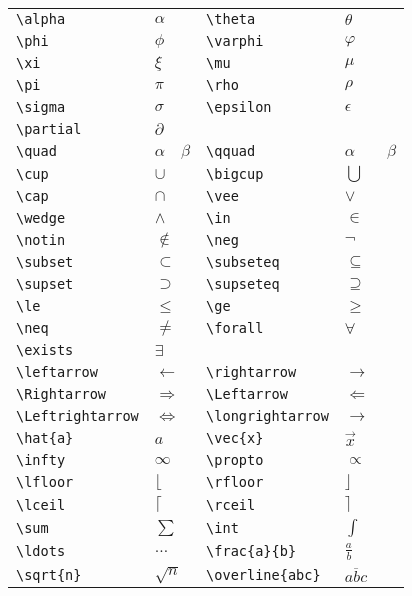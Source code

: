 \begin{tabular}{@{}ll|ll@{}}
  \verb$\alpha$ & $\alpha$ & \verb$\theta$ & $\theta$ \\
  \verb$\phi$ & $\phi$ & \verb$\varphi$ & $\varphi$ \\
  \verb$\xi$ & $\xi$ & \verb$\mu$& $\mu$\\
  \verb$\pi$ & $\pi$ & \verb$\rho$ & $\rho$\\
  \verb$\sigma$ & $\sigma$ & \verb$\epsilon$ & $\epsilon$\\
  \verb$\partial$ & $\partial$\\
  \hline
  \verb$\quad$ & $\alpha\quad\beta$ & \verb$\qquad$ & $\alpha\qquad\beta$\\
  \hline
  \verb$\cup$ & $\cup$ & \verb$\bigcup$ & $\bigcup$ \\
  \verb$\cap$ & $\cap$ & \verb$\vee$ & $\vee$ \\
  \verb$\wedge$ & $\wedge$ & \verb$\in$ & $\in$ \\
  \verb$\notin$ & $\notin$ & \verb$\neg$ & $\neg$ \\
  \verb$\subset$ & $\subset$ & \verb$\subseteq$ & $\subseteq$\\
  \verb$\supset$ & $\supset$ & \verb$\supseteq$ & $\supseteq$ \\
  \verb$\le$ & $\le$ & \verb$\ge$ & $\ge$\\
  \verb$\neq$ & $\neq$ & \verb$\forall$ & $\forall$\\
  \verb$\exists$ & $\exists$\\
  \hline
  \verb$\leftarrow$ & $\leftarrow$ & \verb$\rightarrow$ & $\rightarrow$\\
  \verb$\Rightarrow$ & $\Rightarrow$ & \verb$\Leftarrow$ & $\Leftarrow$\\
  \verb$\Leftrightarrow$ & $\Leftrightarrow$ & \verb$\longrightarrow$ & $\longrightarrow$\\
  \hline
  \verb$\hat{a}$ & $\hat{a}$ & \verb$\vec{x}$ & $\vec{x}$\\
  \hline
  \verb$\infty$ & $\infty$ & \verb$\propto$ & $\propto$\\
  \verb$\lfloor$ & $\lfloor$ & \verb$\rfloor$ & $\rfloor$\\
  \verb$\lceil$ & $\lceil$ & \verb$\rceil$ & $\rceil$\\
  \verb$\sum$ & $\sum$ & \verb$\int$ & $\int$\\
  \verb$\ldots$ & $ \ldots$ & \verb$\frac{a}{b}$ & $\frac{a}{b}$\\
  \verb$\sqrt{n}$ & $\sqrt{n}$ & \verb$\overline{abc}$ & $\overline{abc}$\\

\end{tabular}
